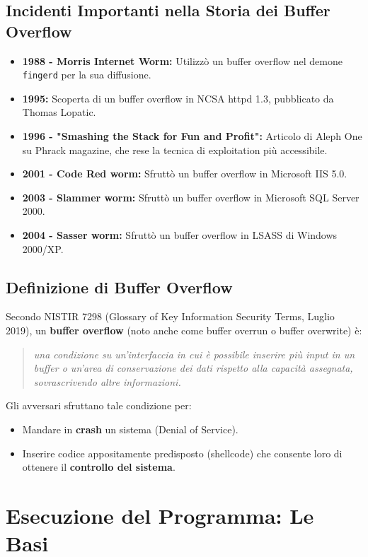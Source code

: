 \documentclass{article}
\begin{document}
\subsection{Incidenti Importanti nella Storia dei Buffer Overflow}
\begin{itemize}
    \item \textbf{1988 - Morris Internet Worm:} Utilizzò un buffer overflow nel demone \texttt{fingerd} per la sua diffusione.
    \item \textbf{1995:} Scoperta di un buffer overflow in NCSA httpd 1.3, pubblicato da Thomas Lopatic.
    \item \textbf{1996 - "Smashing the Stack for Fun and Profit":} Articolo di Aleph One su Phrack magazine, che rese la tecnica di exploitation più accessibile.
    \item \textbf{2001 - Code Red worm:} Sfruttò un buffer overflow in Microsoft IIS 5.0.
    \item \textbf{2003 - Slammer worm:} Sfruttò un buffer overflow in Microsoft SQL Server 2000.
    \item \textbf{2004 - Sasser worm:} Sfruttò un buffer overflow in LSASS di Windows 2000/XP.
\end{itemize}

\subsection{Definizione di Buffer Overflow}
Secondo NISTIR 7298 (Glossary of Key Information Security Terms, Luglio 2019), un \textbf{buffer overflow} (noto anche come buffer overrun o buffer overwrite) è:
\begin{quote}
    \textit{una condizione su un'interfaccia in cui è possibile inserire più input in un buffer o un'area di conservazione dei dati rispetto alla capacità assegnata, sovrascrivendo altre informazioni.}
\end{quote}
Gli avversari sfruttano tale condizione per:
\begin{itemize}
    \item Mandare in \textbf{crash} un sistema (Denial of Service).
    \item Inserire codice appositamente predisposto (shellcode) che consente loro di ottenere il \textbf{controllo del sistema}.
\end{itemize}

\newpage
\section{Esecuzione del Programma: Le Basi}
\end{document}
